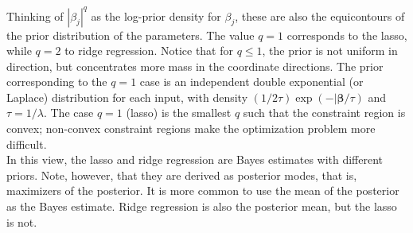 \documentclass[twoside]{article}
\begin{document}
Thinking of $|\beta_j|^q$ as the log-prior density for $\beta_j$, these are also the equicontours of the prior distribution of the parameters. The value $q = 1$ corresponds to the lasso, while $q = 2$ to ridge regression. Notice that for $q \leq 1$, the prior is not uniform in direction, but concentrates more mass in the coordinate directions. The prior corresponding to the $q = 1$ case is an independent double exponential (or Laplace) distribution for each input, with density $(1 / 2\tau)\exp(-|\boldsymbol{\beta}/\tau)$ and $\tau = 1 / \lambda$. The case $q = 1$ (lasso) is the smallest $q$ such that the constraint region is convex; non-convex constraint regions make the optimization problem more difficult.\\
In this view, the lasso and ridge regression are Bayes estimates with different priors. Note, however, that they are derived as posterior modes, that is, maximizers of the posterior. It is more common to use the mean of the posterior as the Bayes estimate. Ridge regression is also the posterior mean, but the lasso is not.
\end{document}
